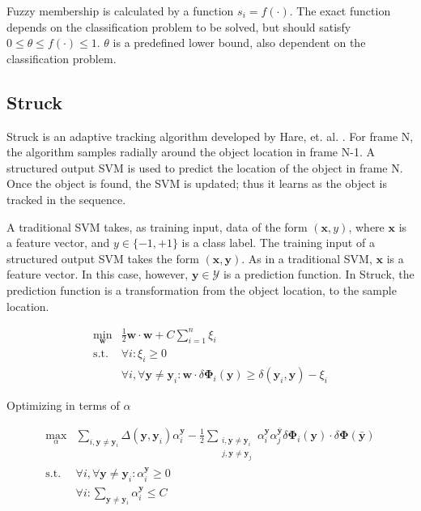 \documentclass{IEEEtran}
\renewcommand{\vec}[1]{\mathbf{#1}}
\newcommand{\half}{\frac{1}{2}}
\newcommand{\loss}{\Delta\left(\vec{y}, \vec{y}_i\right)}
\begin{document}
Fuzzy membership is calculated by a function \(s_i = f(\cdot)\). The exact function depends on the
classification problem to be solved, but should satisfy \(0 \le \theta \le f(\cdot) \le 1\).
\(\theta\) is a predefined lower bound, also dependent on the classification problem.

\subsection{Struck} %
Struck is an adaptive tracking algorithm developed by Hare, et. al. \cite{6126251}. For frame N, the
algorithm samples radially around the object location in frame N-1. A structured output SVM is used
to predict the location of the object in frame N. Once the object is found, the SVM is updated; thus
it learns as the object is tracked in the sequence.

A traditional SVM takes, as training input, data of the form \((\vec{x}, y)\), where
\(\vec{x}\) is a feature vector, and \(y \in \{-1, +1\}\) is a class label. The training input of
a structured output SVM takes the form \((\vec{x}, \vec{y})\). As in a traditional SVM,
\(\vec{x}\) is a feature vector. In this case, however, \(\vec{y} \in \mathcal{Y}\) is a prediction
function. In Struck, the prediction function is a transformation from the object location, to the
sample location.

\begin{align}
    \min_\vec{w} & \half \vec{w} \cdot \vec{w} + C \sum_{i=1}^n \xi_i \\
    \text{s.t. } & \forall i : \xi_i \ge 0 \nonumber \\
    & \forall i, \forall \vec{y} \ne \vec{y}_i : \vec{w} \cdot \delta \vec{\Phi}_i(\vec{y})
    \ge \delta(\vec{y}_i, \vec{y}) - \xi_i \nonumber
\end{align}

Optimizing in terms of \(\alpha\)

\begin{align}
    \max_\alpha & \sum_{i,\vec{y}\ne\vec{y}_i} \loss
    \alpha_i^{\vec{y}} - \half \sum_{\substack{i,\vec{y}\ne\vec{y}_i \\ j,
    \vec{y}\ne\vec{y}_j}} \alpha_i^\vec{y} \alpha_j^{\bar{\vec{y}}} \delta
    \vec{\Phi}_i(\vec{y}) \cdot \delta \vec{\Phi}(\bar{\vec{y}}) \\
    \text{s.t. } & \forall i, \forall \vec{y} \ne \vec{y}_i : \alpha_i^\vec{y} \ge 0 \nonumber \\
    & \forall i : \sum_{\vec{y} \ne \vec{y}_i} \alpha_i^\vec{y} \le C \nonumber
\end{align}
\end{document}

